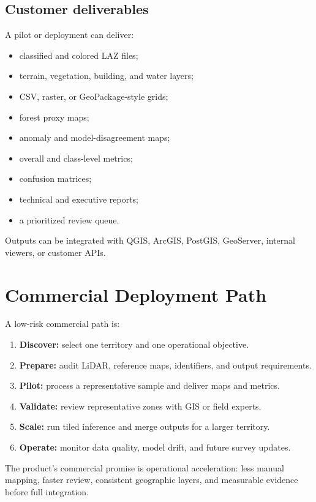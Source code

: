 \documentclass[11pt,a4paper]{article}
\begin{document}
\subsection{Customer deliverables}

A pilot or deployment can deliver:

\begin{itemize}
  \item classified and colored LAZ files;
  \item terrain, vegetation, building, and water layers;
  \item CSV, raster, or GeoPackage-style grids;
  \item forest proxy maps;
  \item anomaly and model-disagreement maps;
  \item overall and class-level metrics;
  \item confusion matrices;
  \item technical and executive reports;
  \item a prioritized review queue.
\end{itemize}

Outputs can be integrated with QGIS, ArcGIS, PostGIS, GeoServer, internal viewers, or customer APIs.

\section{Commercial Deployment Path}

A low-risk commercial path is:

\begin{enumerate}
  \item \textbf{Discover:} select one territory and one operational objective.
  \item \textbf{Prepare:} audit LiDAR, reference maps, identifiers, and output requirements.
  \item \textbf{Pilot:} process a representative sample and deliver maps and metrics.
  \item \textbf{Validate:} review representative zones with GIS or field experts.
  \item \textbf{Scale:} run tiled inference and merge outputs for a larger territory.
  \item \textbf{Operate:} monitor data quality, model drift, and future survey updates.
\end{enumerate}

The product's commercial promise is operational acceleration: less manual mapping, faster review, consistent geographic layers, and measurable evidence before full integration.
\end{document}
